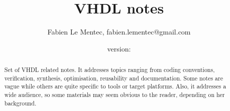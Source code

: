 \documentclass[12pt]{article}
\begin{document}

\newcommand{\note}[1]
{\newpage\section{#1}\label{note:#1}}

\newcommand{\topics}[1]
{\paragraph{}\small{\textit{topics: #1}}}

\newcommand{\related}[1]
{\paragraph{}\small{\textit{related notes: \ref{note:#1}}}}

\newcommand{\todo}[1]
{\paragraph{}\textbf{TODO}: #1}

{\newline\lstset{language=VHDL, frame=single}}{}

{\newline\lstset{frame=single}}{}

\newcommand{\longurl}[2]
{\url{#1#2}}

\newcommand{\longlongurl}[3]
{\url{#1#2#3}}



{}{\newcommand{\version}{none}}

\title{VHDL notes}
\author{Fabien Le Mentec, fabien.lementec@gmail.com}
\date{\small{version: \version}}


\maketitle

\begin{abstract}
Set of VHDL related notes. It addresses topics ranging from coding
conventions, verification, synthesis, optimisation, reusability
and documentation. Some notes are vague while others are quite
specific to tools or target platforms. Also, it addresses a wide
audience, so some materials may seem obvious to the reader,
depending on her background.
\end{abstract}
\end{document}
